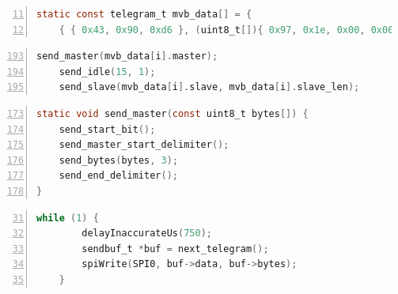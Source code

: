 \begin{lstlisting}[label=cod:telegrama,caption=Definición de un telegrama a transmitir (\texttt{gen.c}).,float=p,numberstyle=\footnotesize\ttfamily,language=C,breaklines=true,numbers=left,firstnumber=11,xleftmargin=1cm]
static const telegram_t mvb_data[] = {
    { { 0x43, 0x90, 0xd6 }, (uint8_t[]){ 0x97, 0x1e, 0x00, 0x00, 0x00, 0x82, 0x14, 0x06, 0xdf, 0x1e, 0x0b, 0x31, 0x0f, 0x00, 0x17, 0x05, 0x8c, 0xf8, 0x00, 0x00, 0x00, 0x00, 0x00, 0x00, 0x03, 0x4d, 0xc9, 0x11, 0x94, 0x11, 0xa8, 0x11, 0xa8, 0x04, 0x05, 0x88 }, 36 },
\end{lstlisting}

\begin{lstlisting}[label=cod:send,caption=Secuencia de pasos para transmitir un telegrama (\texttt{gen.c}).,float=p,numberstyle=\footnotesize\ttfamily,language=C,breaklines=true,numbers=left,firstnumber=193,xleftmargin=1cm]
    send_master(mvb_data[i].master);
    send_idle(15, 1);
    send_slave(mvb_data[i].slave, mvb_data[i].slave_len);
\end{lstlisting}

\begin{lstlisting}[label=cod:sendmaster,caption=Secuencia de pasos para transmitir la trama \textit{master} (\texttt{gen.c}).,float=p,numberstyle=\footnotesize\ttfamily,language=C,breaklines=true,numbers=left,firstnumber=173,xleftmargin=1cm]
static void send_master(const uint8_t bytes[]) {
    send_start_bit();
    send_master_start_delimiter();
    send_bytes(bytes, 3);
    send_end_delimiter();
}
\end{lstlisting}

\begin{lstlisting}[label=cod:main,caption=Ciclo principal del programa (\texttt{main.c}).,float=p,numberstyle=\footnotesize\ttfamily,language=C,breaklines=true,numbers=left,firstnumber=31,xleftmargin=1cm]
    while (1) {
        delayInaccurateUs(750);
        sendbuf_t *buf = next_telegram();
        spiWrite(SPI0, buf->data, buf->bytes);
    }
\end{lstlisting}

